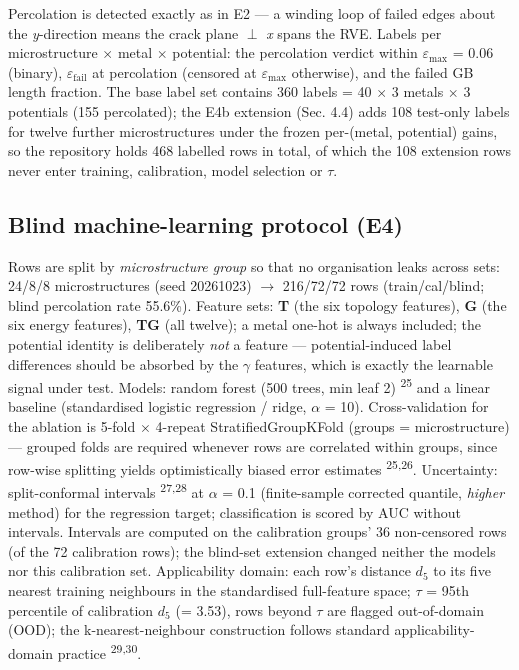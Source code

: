 \documentclass[11pt]{article}
\begin{document}
Percolation is detected exactly as in E2 --- a winding loop of failed edges about the \textit{y}-direction means the crack plane $\perp$ \textit{x} spans the RVE. Labels per microstructure $\times$ metal $\times$ potential: the percolation verdict within $\varepsilon_{\max}$ = 0.06 (binary), $\varepsilon_{\mathrm{fail}}$ at percolation (censored at $\varepsilon_{\max}$ otherwise), and the failed GB length fraction. The base label set contains 360 labels = 40 $\times$ 3 metals $\times$ 3 potentials (155 percolated); the E4b extension (Sec. 4.4) adds 108 test-only labels for twelve further microstructures under the frozen per-(metal, potential) gains, so the repository holds 468 labelled rows in total, of which the 108 extension rows never enter training, calibration, model selection or $\tau$.

\subsection{Blind machine-learning protocol (E4)}

Rows are split by \textit{microstructure group} so that no organisation leaks across sets: 24/8/8 microstructures (seed 20261023) $\rightarrow$ 216/72/72 rows (train/cal/blind; blind percolation rate 55.6\%). Feature sets: \textbf{T} (the six topology features), \textbf{G} (the six energy features), \textbf{TG} (all twelve); a metal one-hot is always included; the potential identity is deliberately \textit{not} a feature --- potential-induced label differences should be absorbed by the $\gamma$ features, which is exactly the learnable signal under test. Models: random forest (500 trees, min leaf 2) \textsuperscript{25} and a linear baseline (standardised logistic regression / ridge, $\alpha$ = 10). Cross-validation for the ablation is 5-fold $\times$ 4-repeat StratifiedGroupKFold (groups = microstructure) --- grouped folds are required whenever rows are correlated within groups, since row-wise splitting yields optimistically biased error estimates \textsuperscript{25,26}. Uncertainty: split-conformal intervals \textsuperscript{27,28} at $\alpha$ = 0.1 (finite-sample corrected quantile, \textit{higher} method) for the regression target; classification is scored by AUC without intervals. Intervals are computed on the calibration groups' 36 non-censored rows (of the 72 calibration rows); the blind-set extension changed neither the models nor this calibration set. Applicability domain: each row's distance $d_5$ to its five nearest training neighbours in the standardised full-feature space; $\tau$ = 95th percentile of calibration $d_5$ (= 3.53), rows beyond $\tau$ are flagged out-of-domain (OOD); the k-nearest-neighbour construction follows standard applicability-domain practice \textsuperscript{29,30}.
\end{document}
